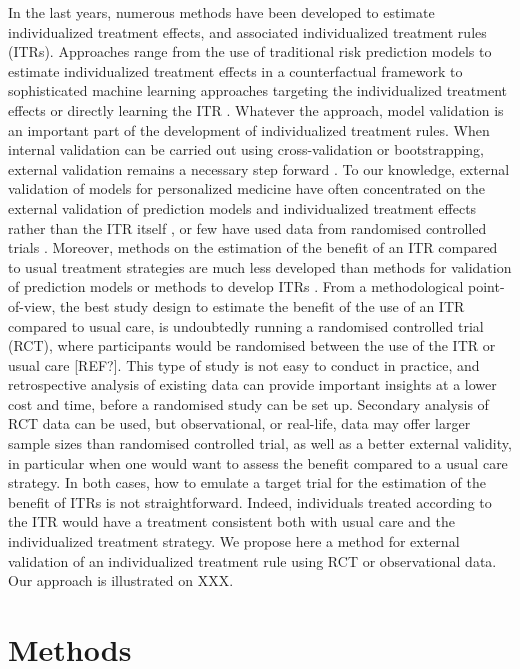 \documentclass[10pt]{article}
\begin{document}
In the last years, numerous methods have been developed to estimate individualized treatment effects, and associated individualized treatment rules (ITRs). Approaches range from the use of traditional risk prediction models to estimate individualized treatment effects in a counterfactual framework \cite{Dorresteijn2011,Nguyen2020} to sophisticated machine learning approaches targeting the individualized treatment effects or directly learning the ITR \cite{Qian2011,Zhang2012,Zhao2015a,Chen2017,Nie2020,Kunzel2019}. Whatever the approach, model validation is an important part of the development of individualized treatment rules. When internal validation can be carried out using cross-validation or bootstrapping, external validation remains a necessary step forward \cite{Steyerberg2013}. To our knowledge, external validation of models for personalized medicine have often concentrated on the external validation of prediction models and individualized treatment effects rather than the ITR itself \cite{Farooq2013,Basu2017}, or few have used data from randomised controlled trials \cite{Modolo2020}. Moreover, methods on the estimation of the benefit of an ITR compared to usual treatment strategies are much less developed than methods for validation of prediction models or methods to develop ITRs \cite{Janes2011,Janes2014,vanKlaveren2018}. From a methodological point-of-view, the best study design to estimate the benefit of the use of an ITR compared to usual care, is undoubtedly running a randomised controlled trial (RCT), where participants would be randomised between the use of the ITR or usual care [REF?]. This type of study is not easy to conduct in practice, and retrospective analysis of existing data can provide important insights at a lower cost and time, before a randomised study can be set up. Secondary analysis of RCT data can be used, but observational, or real-life, data may offer larger sample sizes than randomised controlled trial, as well as a better external validity, in particular when one would want to assess the benefit compared to a usual care strategy. In both cases, how to emulate a target trial for the estimation of the benefit of ITRs is not straightforward. Indeed, individuals treated according to the ITR would have a treatment consistent both with usual care and the individualized treatment strategy. We propose here a method for external validation of an individualized treatment rule using RCT or observational data. Our approach is illustrated on XXX.


\section{Methods}
\end{document}
